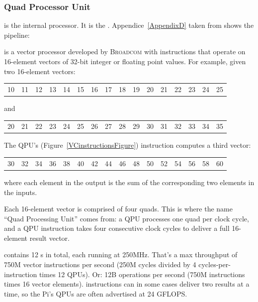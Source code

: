 \subsubsection{Quad Processor Unit}

\qpu{} is the \vc{} internal processor. It is the . Appendice~\ref{AppendixD} taken from \parencite{refVC} shows the pipeline:


\qpu{} is a vector processor developed by \textsc{Broadcom} with instructions that operate on 16-element vectors of 32-bit integer or floating point values. For example, given two 16-element vectors:

\begin{tabular}{cccc|cccc|cccc|cccc}
	10&11&12&13&14&15&16&17&18&19&20&21&22&23&24&25
\end{tabular}

and

\begin{tabular}{cccc|cccc|cccc|cccc}
	20&21&22&23&24&25&26&27&28&29&30&31&32&33&34&35
\end{tabular}

The QPU's  (Figure~\ref{VCinstructionsFigure}) instruction computes a third vector:

\begin{tabular}{cccc|cccc|cccc|cccc}
	30&32&34&36&38&40&42&44&46&48&50&52&54&56&58&60
\end{tabular}

where each element in the output is the sum of the corresponding two elements in the inputs.

Each 16-element vector is comprised of four quads. This is where the name ``Quad Processing Unit'' comes from: a QPU processes one quad per clock cycle, and a QPU instruction takes four consecutive clock cycles to deliver a full 16-element result vector.

\rasp{} contains 12 \qpu{}s in total, each running at 250MHz. That's a max throughput of 750M vector instructions per second (250M cycles divided by 4 cycles-per-instruction times 12 QPUs). Or: 12B operations per second (750M instructions times 16 vector elements). \qpu{} instructions can in some cases deliver two results at a time, so the Pi's QPUs are often advertised at 24 GFLOPS.



